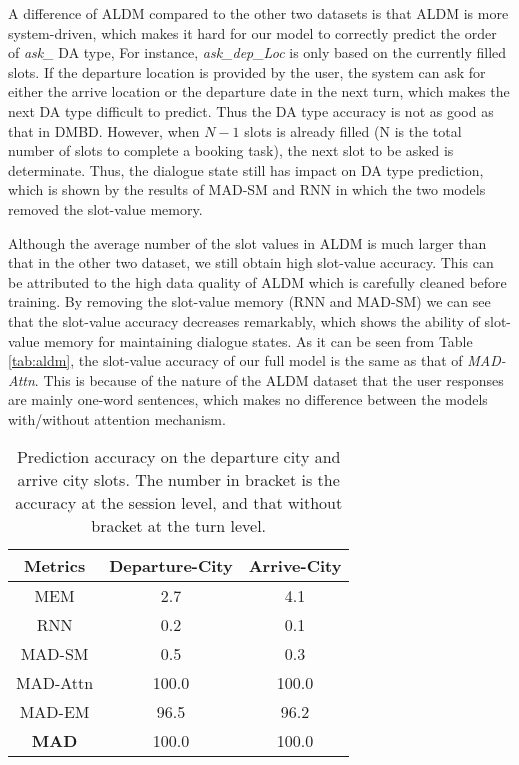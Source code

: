 A difference of ALDM compared to the other two datasets is that ALDM is more system-driven, which makes it hard for our model to correctly predict the order of {\em ask\_} DA type, %
For instance, {\em ask\_dep\_Loc} is only based on the currently filled slots. If the departure location is provided by the user, the system can ask for either the arrive location or the departure date in the next turn, which makes the next DA type difficult to predict. Thus the DA type accuracy is not as good as that in DMBD. However, when $N-1$ slots is already filled (N is the total number of slots to complete a booking task), the next slot to be asked is determinate. Thus, the dialogue state still has impact on DA type prediction, which is shown by the results of MAD-SM and RNN in which the two models removed the slot-value memory.

Although the average number of the slot values in ALDM is much larger than that in the other two dataset, we still obtain high slot-value accuracy. This can be attributed to the high data quality of ALDM which is carefully cleaned before training. By removing the slot-value memory (RNN and MAD-SM) we can see that the slot-value accuracy decreases remarkably, which shows the ability of slot-value memory for maintaining dialogue states. As it can be seen from Table \ref{tab:aldm}, the slot-value accuracy of our full model is the same as that of {\em MAD-Attn}. This is because of the nature of the ALDM dataset that the user responses are mainly one-word sentences, which makes no difference between the models with/without attention mechanism.


\begin{table}[htbp]
\small
\begin{center}
\begin{tabular}{ c | c c }
  \hline
    Metrics & {Departure-City} & {Arrive-City}\\
  \hline
    MEM & 2.7 & 4.1  \\ 
    RNN & 0.2  & 0.1  \\
    MAD-SM & 0.5 & 0.3 \\
    MAD-Attn & 100.0  & 100.0  \\
    MAD-EM & 96.5  & 96.2  \\
  \hline
    {\bf MAD} & 100.0  & 100.0 \\
  \hline
\end{tabular}
\end{center}
\caption{\label{tab:departure-arrive}Prediction accuracy on the departure city and arrive city slots. The number in bracket is the accuracy at the session level, and that without bracket at the turn level.}
\end{table}

